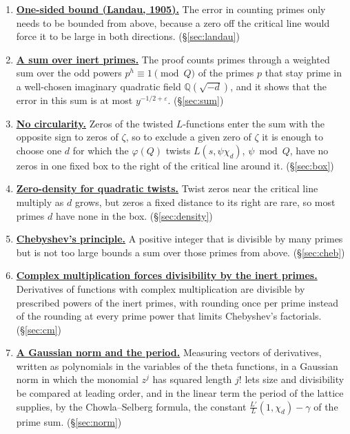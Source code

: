 \documentclass[11pt]{amsart}
\numberwithin{equation}{section}
\theoremstyle{definition}
\theoremstyle{remark}
\newcommand{\Q}{\mathbb Q}
\begin{document}
\begin{enumerate}[leftmargin=2.2em,label=\textbf{\arabic*.},itemsep=4pt]
\item\label{step:1} \hyperref[sec:landau]{\textbf{One-sided bound (Landau, 1905).}} The error in counting primes only needs to be bounded from above, because a zero off the critical line would force it to be large in both directions. \hfill(\S\ref{sec:landau})
\item\label{step:2} \hyperref[sec:sum]{\textbf{A sum over inert primes.}} The proof counts primes through a weighted sum over the odd powers $p^h\equiv1\pmod Q$ of the primes $p$ that stay prime in a well-chosen imaginary quadratic field $\Q(\sqrt{-d})$, and it shows that the error in this sum is at most $y^{-1/2+\varepsilon}$. \hfill(\S\ref{sec:sum})
\item\label{step:3} \hyperref[sec:box]{\textbf{No circularity.}} Zeros of the twisted $L$-functions enter the sum with the opposite sign to zeros of $\zeta$, so to exclude a given zero of $\zeta$ it is enough to choose one $d$ for which the $\varphi(Q)$ twists $L(s,\psi\chi_d)$, $\psi\bmod Q$, have no zeros in one fixed box to the right of the critical line around it. \hfill(\S\ref{sec:box})
\item\label{step:4} \hyperref[sec:density]{\textbf{Zero-density for quadratic twists.}} Twist zeros near the critical line multiply as $d$ grows, but zeros a fixed distance to its right are rare, so most primes $d$ have none in the box. \hfill(\S\ref{sec:density})
\item\label{step:5} \hyperref[sec:cheb]{\textbf{Chebyshev's principle.}} A positive integer that is divisible by many primes but is not too large bounds a sum over those primes from above. \hfill(\S\ref{sec:cheb})
\item\label{step:6} \hyperref[sec:cm]{\textbf{Complex multiplication forces divisibility by the inert primes.}} Derivatives of functions with complex multiplication are divisible by prescribed powers of the inert primes, with rounding once per prime instead of the rounding at every prime power that limits Chebyshev's factorials. \hfill(\S\ref{sec:cm})
\item\label{step:7} \hyperref[sec:norm]{\textbf{A Gaussian norm and the period.}} Measuring vectors of derivatives, written as polynomials in the variables of the theta functions, in a Gaussian norm in which the monomial $z^j$ has squared length $j!$ lets size and divisibility be compared at leading order, and in the linear term the period of the lattice supplies, by the Chowla--Selberg formula, the constant $\frac{L'}L(1,\chi_d)-\gamma$ of the prime sum. \hfill(\S\ref{sec:norm})

\end{enumerate}
\end{document}
